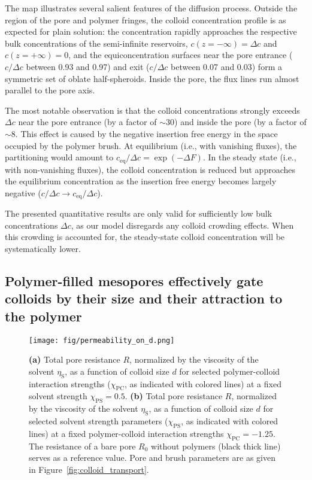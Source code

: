 \documentclass[12pt, a4paper]{article}
\begin{document}
The map illustrates several salient features of the diffusion process.
Outside the region of the pore and polymer fringes, the colloid concentration profile is as expected for plain solution: the concentration rapidly approaches the respective bulk concentrations of the semi-infinite reservoirs, $c(z = -\infty) = \Delta c$ and $c(z = +\infty) = 0$, and the equiconcentration surfaces near the pore entrance ($c/\Delta c$ between 0.93 and 0.97) and exit ($c/\Delta c$ between 0.07 and 0.03) form a symmetric set of oblate half-spheroids.
Inside the pore, the flux lines run almost parallel to the pore axis.

The most notable observation is that the colloid concentrations strongly exceeds $\Delta c$ near the pore entrance (by a factor of $\sim30$) and inside the pore (by a factor  of $\sim8$.
This effect is caused by the negative insertion free energy in the space occupied by the polymer brush.
At equilibrium (i.e., with vanishing fluxes), the partitioning would amount to $c_{\text{eq}}/\Delta c = \exp\left( -\Delta F \right)$.
In the steady state (i.e., with non-vanishing fluxes), the colloid concentration is reduced but approaches the equilibrium concentration as the insertion free energy becomes largely negative ($c/\Delta c \to c_{\text{eq}}/\Delta c$).

The presented quantitative results are only valid for sufficiently low bulk concentrations $\Delta c$, as our model disregards any colloid crowding effects.
When this crowding is accounted for, the steady-state colloid concentration will be systematically lower.



\subsection{Polymer-filled mesopores effectively gate colloids by their size and their attraction to the polymer}
\begin{figure}
    \centering
    \texttt{[image: fig/permeability\_on\_d.png]}
    \caption{
    \textbf{(a)} 
    Total pore resistance $R$, normalized by the viscosity of the solvent $\eta_\text{S}$, as a function of colloid size $d$ for selected polymer-colloid interaction strengths ($\chi_{\text{PC}}$, as indicated with colored lines) at a fixed solvent strength $\chi_{\text{PS}} =0.5$.
    \textbf{(b)}
    Total pore resistance $R$, normalized by the viscosity of the solvent $\eta_\text{S}$, as a function of colloid size $d$ for selected solvent strength parameters ($\chi_{\text{PS}}$, as indicated with colored lines) at a fixed polymer-colloid interaction strengths $\chi_{\text{PC}} = -1.25$. 
    \\
    The resistance of a bare pore $R_{0}$ without polymers (black thick line) serves as a reference value.
    Pore and brush parameters are as given in Figure~\ref{fig:colloid_transport}. 
    }
    \label{fig:R_vs_d}
\end{figure}
\end{document}
